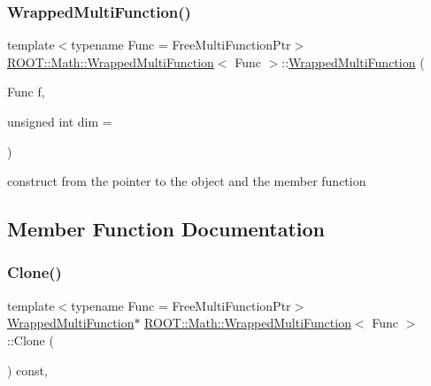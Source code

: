 \subsubsection{\texorpdfstring{WrappedMultiFunction()}{WrappedMultiFunction()}\hspace{0.1cm}{\footnotesize\ttfamily [3/3]}}
{\footnotesize\ttfamily template$<$typename Func  = Free\+Multi\+Function\+Ptr$>$ \\
\mbox{\hyperlink{classROOT_1_1Math_1_1WrappedMultiFunction}{R\+O\+O\+T\+::\+Math\+::\+Wrapped\+Multi\+Function}}$<$ Func $>$\+::\mbox{\hyperlink{classROOT_1_1Math_1_1WrappedMultiFunction}{Wrapped\+Multi\+Function}} (\begin{DoxyParamCaption}\item[{Func}]{f,  }\item[{unsigned int}]{dim = {} }\end{DoxyParamCaption})\hspace{0.3cm}{\ttfamily [inline]}}

construct from the pointer to the object and the member function 

\subsection{Member Function Documentation}
\mbox{\label{classROOT_1_1Math_1_1WrappedMultiFunction_aafa24e359a607b4278f1bf238bdbc336}} 
\subsubsection{\texorpdfstring{Clone()}{Clone()}\hspace{0.1cm}{\footnotesize\ttfamily [1/3]}}
{\footnotesize\ttfamily template$<$typename Func  = Free\+Multi\+Function\+Ptr$>$ \\
\mbox{\hyperlink{classROOT_1_1Math_1_1WrappedMultiFunction}{Wrapped\+Multi\+Function}}$\ast$ \mbox{\hyperlink{classROOT_1_1Math_1_1WrappedMultiFunction}{R\+O\+O\+T\+::\+Math\+::\+Wrapped\+Multi\+Function}}$<$ Func $>$\+::Clone (\begin{DoxyParamCaption}{ }\end{DoxyParamCaption}) const\hspace{0.3cm}{\ttfamily [inline]}, {\ttfamily [virtual]}}




